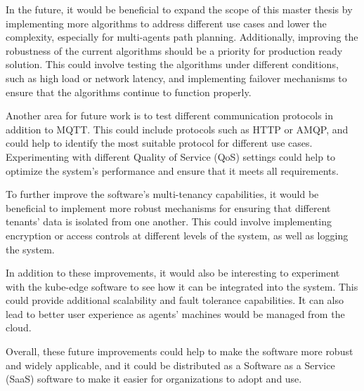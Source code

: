 In the future, it would be beneficial to expand the scope of this master thesis by implementing more algorithms to address different use cases and lower the complexity, especially for multi-agents path planning. Additionally, improving the robustness of the current algorithms should be a priority for production ready solution. This could involve testing the algorithms under different conditions, such as high load or network latency, and implementing failover mechanisms to ensure that the algorithms continue to function properly.

Another area for future work is to test different communication protocols in addition to MQTT. This could include protocols such as HTTP or AMQP, and could help to identify the most suitable protocol for different use cases. Experimenting with different Quality of Service (QoS) settings could help to optimize the system's performance and ensure that it meets all requirements.

To further improve the software's multi-tenancy capabilities, it would be beneficial to implement more robust mechanisms for ensuring that different tenants' data is isolated from one another. This could involve implementing encryption or access controls at different levels of the system, as well as logging the system.

In addition to these improvements, it would also be interesting to experiment with the kube-edge software to see how it can be integrated into the system. This could provide additional scalability and fault tolerance capabilities. It can also lead to better user experience as agents' machines would be managed from the cloud.

Overall, these future improvements could help to make the software more robust and widely applicable, and it could be distributed as a Software as a Service (SaaS) software to make it easier for organizations to adopt and use.